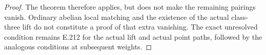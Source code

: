 \begin{proof}
The theorem therefore applies, but does not make the remaining
pairings vanish. Ordinary abelian local matching and the
existence of the actual class-three lift do not constitute
a proof of that extra vanishing. The exact unresolved
condition remains E.212 for the actual lift and actual
point paths, followed by the analogous conditions at
subsequent weights.
\end{proof}
